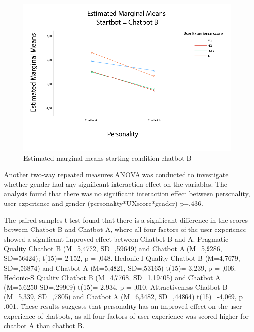 \begin{figure}
    \centering
    \includegraphics[scale=0.4]{figures/MMeanStartbotB.png}
    \caption{Estimated marginal means starting condition chatbot B}
    \label{fig:startB}
\end{figure}

Another two-way repeated measures ANOVA was conducted to investigate whether gender had any significant interaction effect on the variables. The analysis found that there was no significant interaction effect between personality, user experience and gender (personality*UXscore*gender) p=,436.

The paired samples t-test found that there is a significant difference in the scores between Chatbot B and Chatbot A, where all four factors of the user experience showed a significant improved effect between Chatbot B and A. Pragmatic Quality Chatbot B (M=5,4732, SD=,59649) and Chatbot A (M=5,9286, SD=56424); t(15)=-2,152, p = ,048. Hedonic-I Quality Chatbot B (M=4,7679, SD=,56874) and Chatbot A (M=5,4821, SD=,53165) t(15)=-3,239, p = ,006. Hedonic-S Quality Chatbot B (M=4,7768, SD=1,19405) and Chatbot A (M=5,6250 SD=,29909) t(15)=-2,934, p = ,010. Attractiveness Chatbot B (M=5,339, SD=,7805) and Chatbot A (M=6,3482, SD=,44864) t(15)=-4,069, p = ,001. These results suggests that personality has an improved effect on the user experience of chatbots, as all four factors of user experience was scored higher for chatbot A than chatbot B.

